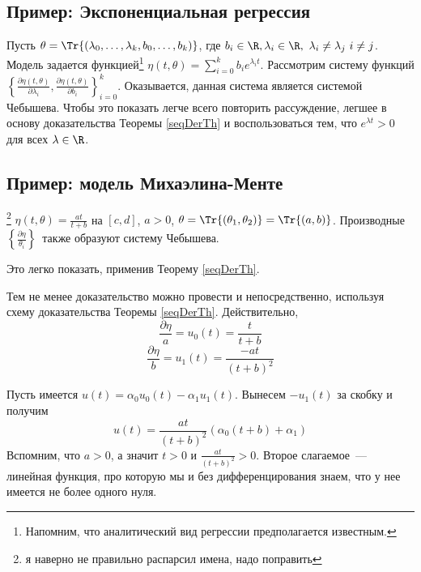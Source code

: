 \subsection{Пример: Экспоненциальная регрессия}
Пусть $\theta = \Tr{(\lambda_0, \ldots, \lambda_k, b_0, \ldots, b_k)}$, где $b_i \in \R, \lambda_i \in \R, \lambda_i \neq \lambda_j i \neq j$.
Модель задается функцией\footnote{Напомним, что аналитический вид регрессии предполагается известным.} 
$\eta(t, \theta) = \sum\limits_{i=0}^k b_i e^{\lambda_it}$.
Рассмотрим систему функций 
$\left\{ \frac{\partial \eta(t, \theta)}{\partial \lambda_i}, \frac{\partial \eta(t, \theta)}{\partial b_i} \right\}_{i=0}^{k}$.
Оказывается, данная система является системой Чебышева.
Чтобы это показать легче всего повторить рассуждение, легшее в основу доказательства Теоремы \eqref{seqDerTh} и воспользоваться тем, что $e^{\lambda t} > 0$ для всех $\lambda \in \R$.

\subsection{Пример: модель Михаэлина-Менте}\footnote{я наверно не правильно распарсил имена, надо поправить}
$\eta(t, \theta) = \frac{at}{t+b}$ на $[c, d]$, $a > 0$, $\theta = \Tr{(\theta_1, \theta_2)} = \Tr{(a, b)}$.
Производные $\left\{\frac{\partial\eta}{\theta_i}\right\}$ также образуют систему Чебышева. 

Это легко показать, применив Теорему \eqref{seqDerTh}.

{\footnotesize Тем не менее доказательство можно провести и непосредственно, используя схему доказательства Теоремы \eqref{seqDerTh}.
Действительно,
$$\frac{\partial\eta}{a} = u_0(t) = \frac{t}{t+b}$$
$$ \frac{\partial\eta}{b} = u_1(t) = \frac{-at}{(t+b)^2}$$

Пусть имеется $u(t) = \alpha_0 u_0(t) - \alpha_1u_1(t)$. Вынесем $-u_1(t)$ за скобку и получим
$$u(t) = \frac{at}{(t+b)^2}\left( \alpha_0 (t+b) + \alpha_1  \right)$$
Вспомним, что $a >0$, а значит $t > 0$ и $\frac{at}{(t+b)^2} > 0$. Второе слагаемое — линейная функция, про которую мы и без дифференцирования знаем, что у нее имеется не более одного нуля.}
